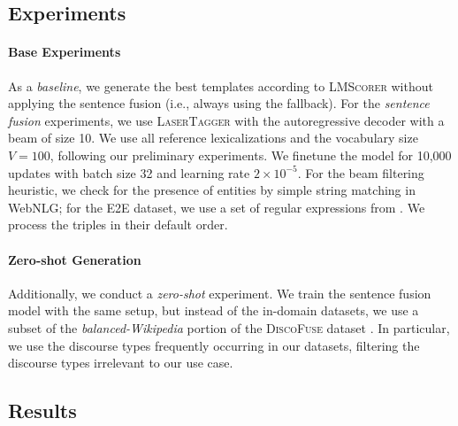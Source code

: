 \subsection{Experiments}
\paragraph{Base Experiments} As a \emph{baseline}, we generate the best templates according to \textsc{LMScorer} without applying the sentence fusion (i.e., always using the fallback). For the \emph{sentence fusion} experiments, we use \textsc{LaserTagger} with the autoregressive decoder with a beam of size 10. We use all reference lexicalizations and the vocabulary size $V=100$, following our preliminary experiments. We finetune the model for 10,000 updates with batch size 32 and learning rate $2 \times 10^{-5}$.
For the beam filtering heuristic, we check for the presence of entities by simple string matching in WebNLG; for the E2E dataset, we use a set of regular expressions from \citet{dusekSemanticNoiseMatters2019}. We process the triples in their default order.

\paragraph{Zero-shot Generation} Additionally, we conduct a \textit{zero-shot} experiment. We train the sentence fusion model with the same setup, but instead of the in-domain datasets, we use a subset of the \emph{balanced-Wikipedia} portion of the \textsc{DiscoFuse} dataset \cite{geva-etal-2019-discofuse}. In particular, we use the discourse types frequently occurring in our datasets, filtering the discourse types irrelevant to our use case.


\subsection{Results}


